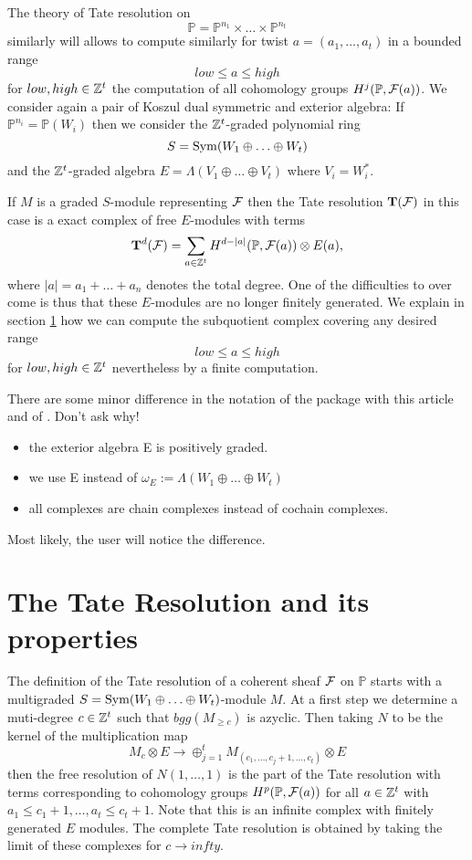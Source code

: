\documentclass[twoside,12pt, leqno]{amsart}
\def\PP{{\mathbb P}}
\def\bT{{\bf T}}
\begin{document}
 \medskip

The theory of Tate resolution on 
$$
\PP = \PP^{n_1}\times \ldots \times \PP^{n_t}
$$
similarly will allows to compute similarly for twist $a = (a_1,\ldots,a_t)$ in a bounded range
$$ low \le a \le high$$
for $low,high \in {\mathbb Z}^t$ the computation of all cohomology groups
$ H^j(\PP, \sF(a))$.
We consider again a pair of Koszul dual symmetric and exterior algebra:
If $\PP^{n_i}= \PP(W_i)$ then we consider the ${\mathbb Z}^t$-graded polynomial ring 
$$
S=\operatorname{Sym}(W_1 \oplus \ldots \oplus W_t)
$$
and the ${\mathbb Z}^t$-graded algebra $E= \Lambda(V_1 \oplus \ldots \oplus V_t)$ where $V_i =W_i^*$.

If $M$ is a graded $S$-module representing ${\mathcal F}$ then the Tate resolution $\bT(\sF)$ in this case is a
exact complex of free $E$-modules with terms
$$
\bT^d(\sF)= \sum_{a \in \ZZ^t} H^{d-|a|}(\PP,\sF(a)) \otimes E(a),
$$
where $|a|=a_1+\ldots+a_n$ denotes the total degree.
One of the difficulties to over come is thus that these $E$-modules are no longer finitely generated. We explain in section \ref{TateRes}
how we can compute the subquotient complex covering any desired range
$$ low \le a \le high$$
for $low, high \in {\mathbb Z}^t$ nevertheless by a finite computation.

There are some minor difference in the notation of the package with this article and of \cite{EES}. Don't ask why!
\begin{itemize}
\item the exterior algebra E is positively graded.
\item we use E instead of $\omega_E:=\Lambda(W_1 \oplus \ldots \oplus W_t)$
\item all complexes are chain complexes instead of cochain complexes.
\end{itemize}
Most likely, the user will notice the difference.


\section{The Tate Resolution and its properties}\label{TateRes}

The definition of the Tate resolution of a coherent sheaf ${\mathcal F}$ on $\PP$ starts with a multigraded $S=\operatorname{Sym}(W_1 \oplus \ldots \oplus W_t)$-module $M$. At a first step we determine a muti-degree $c \in {\mathbb Z}^t$ such that $bgg(M_{ \ge c})$ is azyclic.
Then taking $N$ to be the kernel of the multiplication map
$$ M_c \otimes E \to \oplus_{j=1}^t M_{(c_1,\ldots,c_j+1,\ldots,c_t)} \otimes E $$
then the free resolution of $N(1,\ldots,1)$ is the part of the Tate resolution  with terms corresponding to cohomology groups
$H^p(\PP, \sF(a))$ for all $a \in {\mathbb Z}^t$ with $a_1\le c_1 +1, \ldots, a_t \le c_t+1$. 
Note that this is an infinite complex with finitely generated $E$ modules.
The complete Tate resolution is obtained by taking the limit of these complexes for $c \to infty$.
\end{document}
